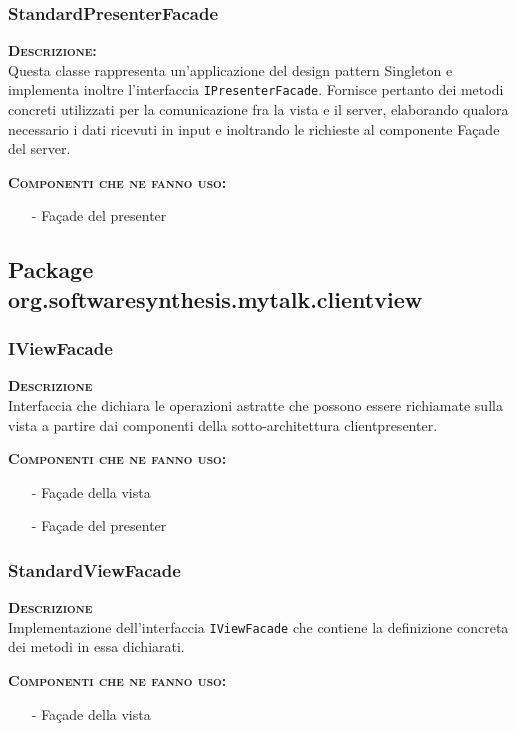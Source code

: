 \subsubsection{StandardPresenterFacade}
\begin{description}
	\item{\scshape\bfseries Descrizione:}\\
Questa classe rappresenta un'applicazione del design pattern Singleton e implementa inoltre l'interfaccia \texttt{IPresenterFacade}. Fornisce pertanto dei metodi concreti utilizzati per la comunicazione fra la vista e il server, elaborando qualora necessario i dati ricevuti in input e inoltrando le richieste al componente Façade del server.
	\item{\scshape\bfseries Componenti che ne fanno uso:}
	\begin{itemize}[noitemsep,nolistsep]
	  \item[-] Façade del presenter
	\end{itemize}
\end{description}

\subsection{Package org.softwaresynthesis.mytalk.clientview}
\subsubsection{IViewFacade}
\begin{description}
  \item{\scshape\bfseries Descrizione}\\
Interfaccia che dichiara le operazioni astratte che possono essere richiamate sulla vista a partire dai componenti della sotto-architettura clientpresenter.
  \item{\scshape\bfseries Componenti che ne fanno uso:}
  \begin{itemize}[noitemsep,nolistsep]
    \item[-] Façade della vista
    \item[-] Façade del presenter
  \end{itemize}
\end{description}

\subsubsection{StandardViewFacade}
\begin{description}
  \item{\scshape\bfseries Descrizione}\\
Implementazione dell'interfaccia \texttt{IViewFacade} che contiene la definizione concreta dei metodi in essa dichiarati.
  \item{\scshape\bfseries Componenti che ne fanno uso:}
  \begin{itemize}[noitemsep,nolistsep]
    \item[-] Façade della vista
  \end{itemize}
\end{description}

